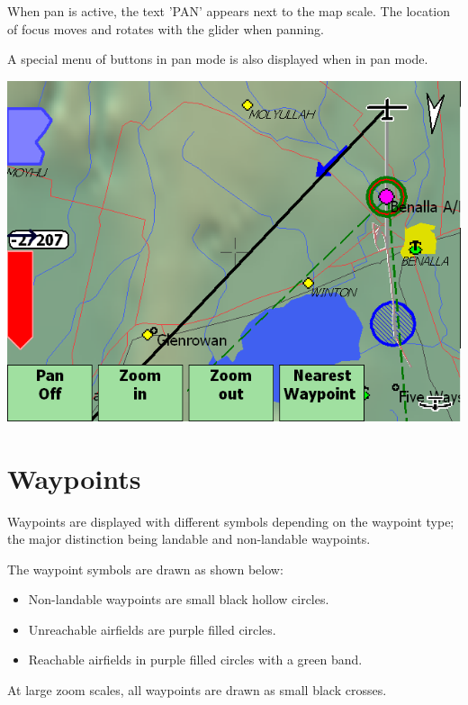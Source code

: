 \documentclass[a4paper,12pt]{refrep}
\begin{document}
When pan is active, the text 'PAN' appears next to the map scale.  The
location of focus moves and rotates with the glider when panning.  

A special menu of buttons in pan mode is also displayed when in pan
mode.

\begin{center}
\includegraphics[angle=0,width=\linewidth,keepaspectratio='true']{figures/pan.png}
\end{center}

\section{Waypoints}
Waypoints are displayed with different symbols depending on the
waypoint type; the major distinction being landable and non-landable
waypoints.

The waypoint symbols are drawn as shown below:
\begin{itemize}
\item Non-landable waypoints are small black hollow circles.
\item Unreachable airfields are purple filled circles.
\item Reachable airfields in purple filled circles with a green band.
\end{itemize}
At large zoom scales, all waypoints are drawn as small black crosses.

\end{document}
